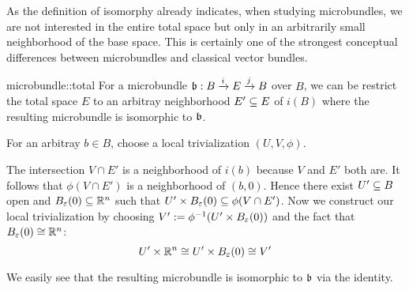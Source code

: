 \begin{myparagraph}
    As the definition of isomorphy already indicates, when studying microbundles,
    we are not interested in the entire total space
    but only in an arbitrarily small neighborhood of the base space.
    This is certainly one of the strongest conceptual differences between microbundles and classical vector bundles.
\end{myparagraph}

\begin{myproposition}{microbundle::total}
    For a microbundle $\bundledef{\bb}{B}{E}{i}{j}$ over $B$, we can be restrict the total space $E$ to an arbitray neighborhood $E' \sub E$ of $i(B)$
    where the resulting microbundle is isomorphic to $\bb$.
    \begin{myproof}
        For an arbitray $b \in B$, choose a local trivialization $(U, V, \phi)$.

        The intersection $V \cap E'$ is a neighborhood of $i(b)$ because $V$ and $E'$ both are.
        It follows that $\phi(V \cap E')$ is a neighborhood of $(b, 0)$. Hence there exist $U' \sub B$ open and $\ball[\varepsilon] \sub \R^n$ such that $U' \times \ball[\varepsilon] \sub \phi(V \cap E')$. 
        Now we construct our local trivialization by choosing $V' := \phi^{-1}(U' \times \ball[\varepsilon])$ and the fact that $\ball[\varepsilon] \cong \R^n$:
        \[ U' \times \R^n \cong U' \times \ball[\varepsilon] \cong V' \]

        We easily see that the resulting microbundle is isomorphic to $\bb$ via the identity.
    \end{myproof}
\end{myproposition}